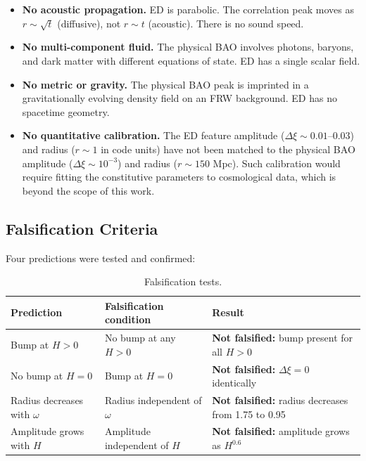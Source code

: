 \documentclass[11pt]{article}
\begin{document}
\begin{itemize}
  \item \textbf{No acoustic propagation.} ED is parabolic. The correlation peak moves as \(r \sim \sqrt{t}\) (diffusive), not \(r \sim t\) (acoustic). There is no sound speed.
  \item \textbf{No multi-component fluid.} The physical BAO involves photons, baryons, and dark matter with different equations of state. ED has a single scalar field.
  \item \textbf{No metric or gravity.} The physical BAO peak is imprinted in a gravitationally evolving density field on an FRW background. ED has no spacetime geometry.
  \item \textbf{No quantitative calibration.} The ED feature amplitude (\(\Delta\xi \sim 0.01\)--\(0.03\)) and radius (\(r \sim 1\) in code units) have not been matched to the physical BAO amplitude (\(\Delta\xi \sim 10^{-3}\)) and radius (\(r \sim 150\) Mpc). Such calibration would require fitting the constitutive parameters to cosmological data, which is beyond the scope of this work.
\end{itemize}

\subsection{Falsification Criteria}

Four predictions were tested and confirmed:

\begin{table}[h]
\centering
\begin{tabular}{@{}lll@{}}
\toprule
Prediction & Falsification condition & Result \\
\midrule
Bump at \(H > 0\) & No bump at any \(H > 0\) & \textbf{Not falsified:} bump present for all \(H > 0\) \\
No bump at \(H = 0\) & Bump at \(H = 0\) & \textbf{Not falsified:} \(\Delta\xi = 0\) identically \\
Radius decreases with \(\omega\) & Radius independent of \(\omega\) & \textbf{Not falsified:} radius decreases from 1.75 to 0.95 \\
Amplitude grows with \(H\) & Amplitude independent of \(H\) & \textbf{Not falsified:} amplitude grows as \(H^{0.6}\) \\
\bottomrule
\end{tabular}
\caption{Falsification tests.}
\label{tab:falsification}
\end{table}
\end{document}
